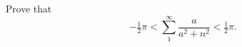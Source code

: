 Prove that
\[
-\tfrac{1}{2} \pi < \sum_{1}^{\infty} \frac{a}{a^{2} + n^{2}} < \tfrac{1}{2} \pi.
\]

